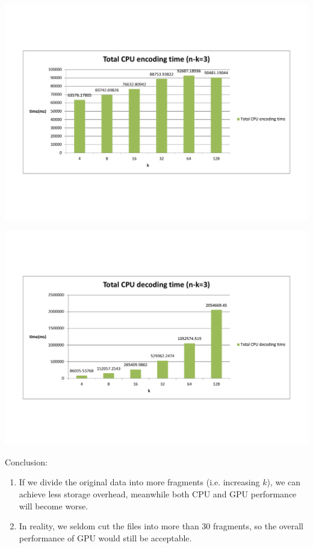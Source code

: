 \documentclass[a4paper]{article}
\begin{document}
\includegraphics[scale=0.5]{result-graph/Total-CPU-encoding-time-3.pdf}

\includegraphics[scale=0.5]{result-graph/Total-CPU-decoding-time-3.pdf}

Conclusion:
\begin{enumerate}
\item If we divide the original data into more fragments (i.e. increasing $k$), we can achieve less storage overhead, meanwhile both CPU and GPU performance will become worse.
\item In reality, we seldom cut the files into more than 30 fragments, so the overall performance of GPU would still be acceptable.
\end{enumerate}
\end{document}
